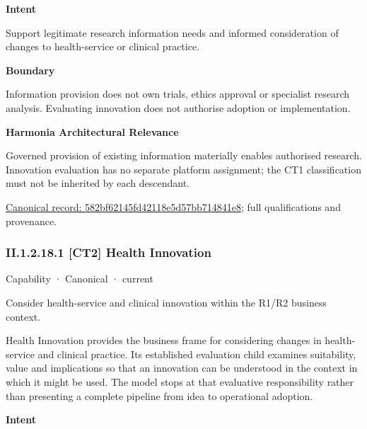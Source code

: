 \textbf{Intent}



Support legitimate research information needs and informed consideration of changes to health-service or clinical practice.



\textbf{Boundary}



Information provision does not own trials, ethics approval or specialist research analysis. Evaluating innovation does not authorise adoption or implementation.



\textbf{Harmonia Architectural Relevance}



Governed provision of existing information materially enables authorised research. Innovation evaluation has no separate platform assignment; the CT1 classification must not be inherited by each descendant.


{\footnotesize \href{../../../../continuum/strategy/capability/582bf62145fd42118e5d57bb714841e8.md}{Canonical record: 582bf62145fd42118e5d57bb714841e8}; full qualifications and provenance.}\par
\subsubsection*{II.1.2.18.1 [CT2] Health Innovation}
\label{navigation:II.1.2.18.1}

\label{element:f263989e25c9469cac1bbad6491432f0}
{\small Capability · Canonical · current}\par

Consider health-service and clinical innovation within the R1/R2 business context.



Health Innovation provides the business frame for considering changes in health-service and clinical practice. Its established evaluation child examines suitability, value and implications so that an innovation can be understood in the context in which it might be used. The model stops at that evaluative responsibility rather than presenting a complete pipeline from idea to operational adoption.



\textbf{Intent}




